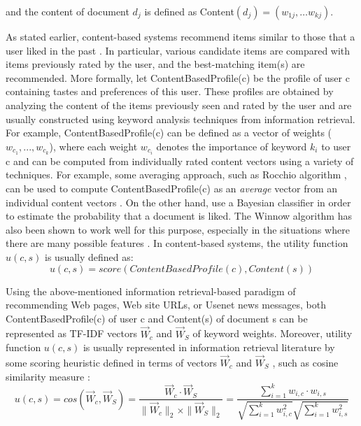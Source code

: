 and the content of document $d_j$ is defined as Content$(d_j) = (w_{1j}, w_{kj})$.


As stated earlier, content-based systems recommend items similar to those that a user liked in the past  \citep{recom_56}  \citep{recom_69}  \citep{recom_77}. In particular, various candidate items are compared with items previously rated by the user, and the best-matching item(s) are recommended. More formally, let ContentBasedProfile(c) be the profile of user c containing tastes and preferences of this user. These profiles are obtained by analyzing the content of the items previously seen and rated by the user and are usually constructed using keyword analysis techniques from information retrieval. For example, ContentBasedProfile(c) can be defined as a vector of weights ($w_{c_1},...,w_{c_k}$), where each weight $w_{c_i}$ denotes the importance of keyword $k_i$ to user c and can be computed from individually rated content vectors using a variety of techniques. For example, some averaging approach, such as Rocchio algorithm  \citep{recom_85}, can be used to compute ContentBasedProfile(c) as an \textit{average} vector from an individual content vectors  \citep{recom_8}  \citep{recom_56}. On the other hand,  \citep{recom_77} use a Bayesian classifier in order to estimate the probability that a document is liked. The Winnow algorithm  \citep{recom_62} has also been shown to work well for this purpose, especially in the situations where there are many possible features  \citep{recom_76}.
In content-based systems, the utility function $u(c, s)$ is usually defined as:
\begin{equation}\label{eq:5}
u(c,s)= score(ContentBasedProfile(c),Content(s))
\end{equation}



Using the above-mentioned information retrieval-based paradigm of recommending Web pages, Web site URLs, or Usenet news messages, both ContentBasedProfile(c) of user c and Content(s) of document s can be represented as TF-IDF vectors $\vec{W}_c$   and $\vec{W}_S$ of keyword weights. Moreover, utility function $u(c, s)$ is usually represented in information retrieval literature by some scoring heuristic defined in terms of vectors $\vec{W}_c$   and $\vec{W}_S$ , such as cosine similarity measure \citep{recom_7} \citep{recom_89}:
\begin{equation}\label{eq:6}
	u(c,s) = cos(\vec{W}_c, \vec{W}_S) = \frac{\vec{W}_c \cdot \vec{W}_S}{ \|\vec{W}_c\|_2 \times \|\vec{W}_S\|_2} = 
	\frac{\sum\limits_{i=1}^k w_{i,c} \cdot w_{i,s}}{\sqrt{\sum\limits_{i=1}^k w_{i,c}^2} \sqrt{\sum\limits_{i=1}^k w_{i,s}^2}}
\end{equation}


